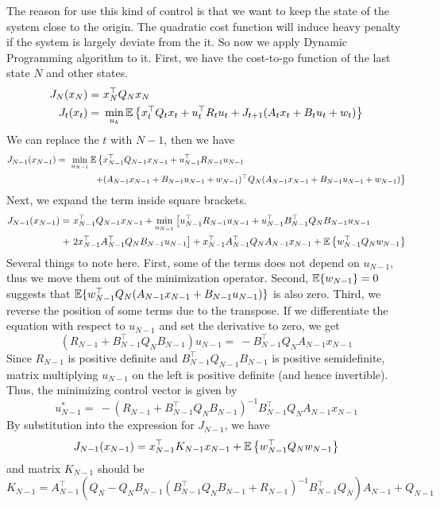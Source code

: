 \documentclass[9pt]{article}
\begin{document}
The reason for use this kind of control is that we want to keep the state of the system close to the origin. The quadratic cost function will induce heavy penalty if the system is largely deviate from the it. 
So now we apply Dynamic Programming algorithm to it. First, we have the cost-to-go function of the last state $N$ and other states.
\[
\begin{split}
J_N(x_N) = &\ x_N^{\top}Q_Nx_N\\
J_t(x_t) = &\ \min_{u_k} \operatorname{\mathbb{E}} \big\{ x_t^{\top}Q_tx_t + u_t^{\top}R_tu_t + J_{t+1}(A_tx_t + B_tu_t+w_t)\big\}
\end{split}
\]
We can replace the $t$ with $N-1$, then we have 
\[
\begin{split}
J_{N-1}(x_{N-1}) =\ \min_{u_{N-1}} \operatorname{\mathbb{E}} \big\{ & x_{N-1}^{\top}Q_{N-1}x_{N-1} + u_{N-1}^{\top}R_{N-1}u_{N-1}\\
 + &(A_{N-1}x_{N-1} + B_{N-1}u_{N-1}+w_{N-1})^{\top}Q_N(A_{N-1}x_{N-1} + B_{N-1}u_{N-1}+w_{N-1})\big\}
\end{split}
\]
Next, we expand the term inside square brackets.
\[
\begin{split}
J_{N-1}(x_{N-1}) = &\  x_{N-1}^{\top}Q_{N-1}x_{N-1} + \min_{u_{N-1}} \big[ u_{N-1}^{\top}R_{N-1}u_{N-1} + u_{N-1}^{\top}B_{N-1}^{\top}Q_NB_{N-1}u_{N-1}\\
 +&\ 2x_{N-1}^{\top}A_{N-1}^{\top}Q_NB_{N-1}u_{N-1}\big] + x_{N-1}^{\top}A_{N-1}^{\top}Q_NA_{N-1}x_{N-1} + \operatorname{\mathbb{E}}\big\{ w_{N-1}^{\top}Q_Nw_{N-1}\big\}
\end{split}
\]
Several things to note here. First, some of the terms does not depend on $u_{N-1}$, thus we move them out of the minimization operator. Second, $\operatorname{\mathbb{E}}\{w_{N-1}\} = 0$ suggests that $\operatorname{\mathbb{E}}\{w_{N-1}^{\top}Q_N(A_{N-1}x_{N-1} + B_{N-1}u_{N-1})\}$ is also zero.
Third, we reverse the position of some terms due to the transpose. If we differentiate the equation with respect to $u_{N-1}$ and set the derivative to zero, we get 
\[
(R_{N-1}+B_{N-1}^{\top}Q_NB_{N-1})u_{N-1} =\ -B_{N-1}^{\top}Q_NA_{N-1}x_{N-1}
\]
Since $R_{N-1}$ is positive definite and $B_{N-1}^{\top}Q_{N-1}B_{N-1}$ is positive semidefinite, matrix multiplying $u_{N-1}$ on the left is positive definite (and hence invertible). Thus, the minimizing control vector is given by
\[
u_{N-1}^{*} =\ -(R_{N-1}+B_{N-1}^{\top}Q_NB_{N-1})^{-1}B_{N-1}^{\top}Q_NA_{N-1}x_{N-1}
\] 
By substitution into the expression for $J_{N-1}$, we have 
\[
J_{N-1}(x_{N-1}) = x_{N-1}^{\top}K_{N-1}x_{N-1} + \operatorname{\mathbb{E}}\big\{w_{N-1}^{\top}Q_Nw_{N-1}\big\}
\]
and matrix $K_{N-1}$ should be
\[
K_{N-1} = A_{N-1}^{\top}(Q_N-Q_NB_{N-1}(B_{N-1}^{\top}Q_NB_{N-1}+R_{N-1})^{-1}B_{N-1}^{\top}Q_N)A_{N-1}+Q_{N-1}
\]
\end{document}

